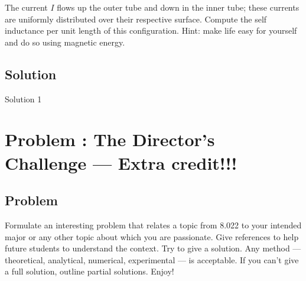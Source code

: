\documentclass[solutions]{esg8022pset}
\begin{document}
\par\noindent The current $I$ flows up the outer tube and down in the
inner tube; these currents are uniformly distributed over their
respective surface.  Compute the self inductance per unit length of
this configuration.  Hint: make life easy for yourself and do so using
magnetic energy.
\subsection{Solution}
  Solution 1
\section{Problem \thesection: The Director's Challenge --- Extra credit!!!}
\subsection{Problem}
   Formulate an interesting problem that relates a topic from 8.022 to your
  intended major or any other topic about which you are passionate.  Give references
  to help future students to understand the context.  Try to give a solution.
  Any method --- theoretical, analytical, numerical, experimental --- is acceptable.
  If you can't give a full solution, outline partial solutions. Enjoy!
\end{document}
